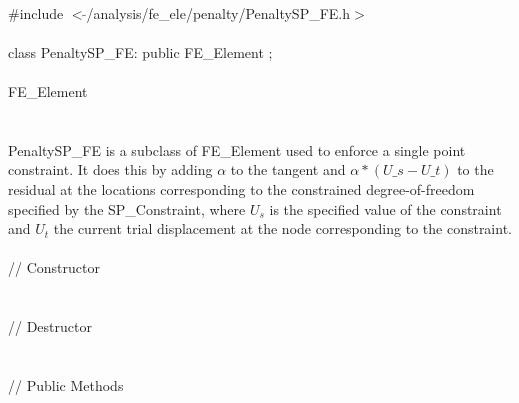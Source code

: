 
   \\
\indent \#include $<\tilde{ }$/analysis/fe\_ele/penalty/PenaltySP\_FE.h$>$  \\

  \\
\indent class PenaltySP\_FE: public FE\_Element ;  \\

  \\
\indent FE\_Element \\
\indent{} \\ 

  \\
\indent PenaltySP\_FE is a subclass of FE\_Element used to enforce a
single point constraint. It does this by adding $\alpha$ to the
tangent and $\alpha * (U\_s - U\_t)$ to the residual at the locations
corresponding to the constrained degree-of-freedom specified by the
SP\_Constraint, where $U_s$ is the specified value of the constraint
and $U_t$ the current trial displacement at the node corresponding to
the constraint.\\


  \\
\indent\indent // Constructor  \\
\indent{} \\ \\
\indent\indent // Destructor  \\
\indent{}  \\ \\
\indent\indent // Public Methods \\
\indent{} \\ 
\indent{} \\  
\indent{} \\ 
\indent{}\\

